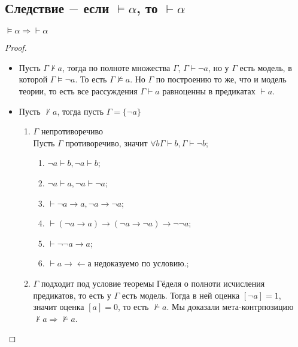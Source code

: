 \subsection{Следствие $-$ если $\models \alpha$, то $\vdash \alpha$}
\label{sec-8-7}
\begin{theorem}
$\models \alpha \Rightarrow \vdash \alpha$
\end{theorem}
\begin{proof}
\begin{itemize}
\item Пусть $\Gamma \not \vdash a$, тогда по полноте множества $\Gamma$, $\Gamma \vdash \neg a$, но у $\Gamma$ есть модель, в которой $\Gamma \models \neg a$. То есть $\Gamma \not \models a$. Но $\Gamma$ по построению то же, что и модель теории, то есть все рассуждения $\Gamma \vdash a$ равноценны в предикатах $\vdash a$.
\item Пусть $\not \vdash a$, тогда пусть $\Gamma=\lbrace \neg a \rbrace$
\begin{enumerate}
\item $\Gamma$ непротиворечиво\\
Пусть $\Gamma$ противоречиво, значит $\forall b \Gamma \vdash b, \Gamma \vdash \neg b$;
\begin{enumerate}[label=(\alph*)]
\item $\neg a \vdash b, \neg a \vdash b$;
\item $\neg a \vdash a, \neg a \vdash \neg a$;
\item $\vdash \neg a \to a, \neg a \to \neg a$;
\item $\vdash (\neg a \to a) \to (\neg a \to \neg a) \to \neg \neg a$;
\item $\vdash \neg \neg a \to a$;
\item $\vdash a \to\leftarrow а$ недоказуемо по условию.;
\end{enumerate}
\item $\Gamma$ подходит под условие теоремы Гёделя о полноти исчисления предикатов, то есть у $\Gamma$ есть модель. Тогда в ней оценка $[\neg a] = 1$, значит оценка $[a] = 0$, то есть $\not \models a$. Мы доказали мета-контрпозицию $\not \vdash a \Rightarrow \not \models a$.
\end{enumerate}
\end{itemize}
\end{proof}